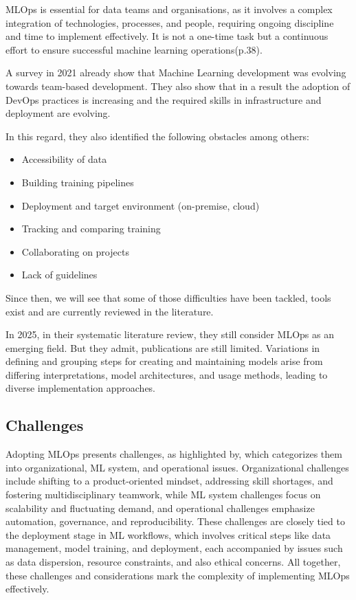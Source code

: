 MLOps is essential for data teams and organisations, as it involves a complex integration of technologies, processes, and people, requiring ongoing discipline and time to implement effectively.
It is not a one-time task but a continuous effort to ensure successful machine learning operations\cite{treveil2020introducing}(p.38).

A survey in 2021\cite{DBLP:journals/corr/abs-2103-08942} already show that Machine Learning development was evolving towards team-based development.
They also show that in a result the adoption of DevOps practices is increasing and the required skills in infrastructure and deployment are evolving.

In this regard, they also identified the following obstacles among others\cite{DBLP:journals/corr/abs-2103-08942}:
    \begin{itemize}
        \item Accessibility of data
        \item Building training pipelines
        \item Deployment and target environment (on-premise, cloud)
        \item Tracking and comparing training
        \item Collaborating on projects
        \item Lack of guidelines
    \end{itemize}

Since then, we will see that some of those difficulties have been tackled, tools exist and are currently reviewed in the literature.

In 2025, in their systematic literature review\cite{10855428}, they still consider MLOps as an emerging field.
But they admit, publications are still limited.
Variations in defining and grouping steps for creating and maintaining models arise from differing interpretations,
model architectures, and usage methods, leading to diverse implementation approaches.

\subsection{Challenges}\label{subsec:challenges}

Adopting MLOps presents challenges, as highlighted by\cite{Kreuzberger2022MachineLO}, which categorizes them into organizational,
ML system, and operational issues.
Organizational challenges include shifting to a product-oriented mindset, addressing skill shortages,
and fostering multidisciplinary teamwork, while ML system challenges focus on scalability and fluctuating demand,
and operational challenges emphasize automation, governance, and reproducibility.
These challenges are closely tied to the deployment stage in ML workflows, which involves critical steps like data management,
model training, and deployment, each accompanied by issues such as data dispersion, resource constraints, and also ethical concerns\cite{10.1145/3533378}.
All together, these challenges and considerations mark the complexity of implementing MLOps effectively.

